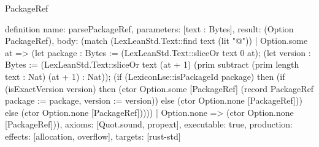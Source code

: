 \begin{lexlean}{PackageRef}
\begin{semanticmodule}
definition{
  name: parsePackageRef,
  parameters: [text : Bytes],
  result: (Option PackageRef),
  body: (match (LexLeanStd.Text::find text (lit "@"))
    | Option.some at => (let package : Bytes := (LexLeanStd.Text::sliceOr text 0 at); (let version : Bytes := (LexLeanStd.Text::sliceOr text (at + 1) (prim subtract (prim length text : Nat) (at + 1) : Nat)); (if (LexiconLse::isPackageId package) then (if (isExactVersion version) then (ctor Option.some [PackageRef] (record PackageRef {package := package, version := version})) else (ctor Option.none [PackageRef])) else (ctor Option.none [PackageRef]))))
    | Option.none => (ctor Option.none [PackageRef])),
  axioms: [Quot.sound, propext],
  executable: true,
  production: {effects: [allocation, overflow], targets: [rust-std]}
}
\end{semanticmodule}
\end{lexlean}
